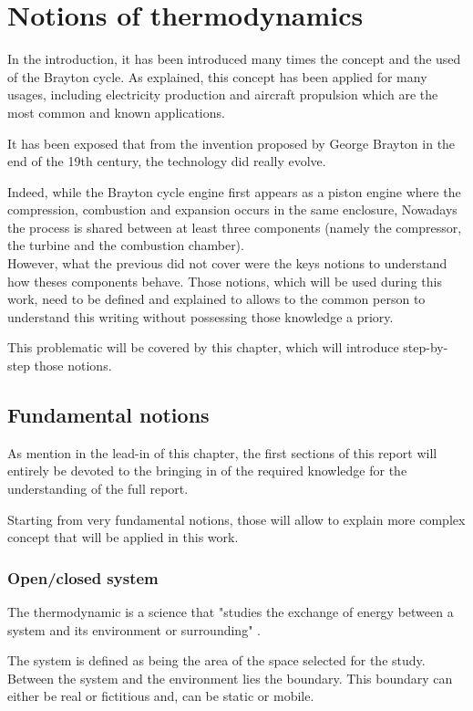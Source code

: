 \chapter{Notions of thermodynamics}
\quad\; In the introduction, it has been introduced many times the concept and the used of the Brayton cycle. As explained, this concept has been applied for many usages, including electricity production and aircraft propulsion which are the most common and known applications.

It has been exposed that from the invention proposed by George Brayton in the end of the 19th century, the technology did really evolve.

Indeed, while the Brayton cycle engine first appears as a  piston engine where the compression, combustion and expansion occurs in the same enclosure, Nowadays 
the process is shared between at least three components (namely the compressor, the turbine and the combustion chamber).\\

However, what the previous did not cover were the keys notions to understand how theses components behave. Those notions, which will be used during this work, need to be defined and explained to allows to the common person to understand this writing without possessing those knowledge a priory. 

This problematic will be covered by this chapter, which will introduce step-by-step those notions.

\section{Fundamental notions}
\quad\; As mention in the lead-in of this chapter, the first sections of this report will entirely be devoted to the bringing in of the required knowledge for the understanding of the full report.

Starting from very fundamental notions, those will allow to explain more complex concept that will be applied in this work.

\subsection{Open/closed system}
\quad\;  The thermodynamic is a science that "studies the exchange of energy between a system and its environment or surrounding" \cite{thermoApp_1}.

The system is defined as being the area of the space selected for the study. Between the system and the environment lies the boundary. This boundary can either be real or fictitious and, can be static or mobile.\\

